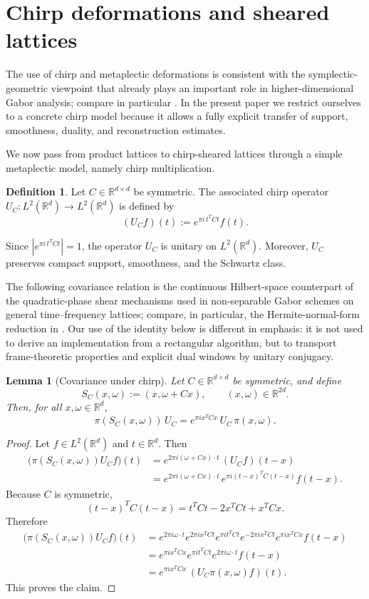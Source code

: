 \documentclass[final,1p,times,authoryear]{elsarticle}
\newtheorem{lemma}[theorem]{Lemma}
\theoremstyle{definition}
\newtheorem{definition}[theorem]{Definition}
\newcommand{\R}{\mathbb{R}}
\newcommand{\1}{\mathbf{1}}
\begin{document}
\section{Chirp deformations and sheared lattices}
\label{sec:chirp}
The use of chirp and metaplectic deformations is consistent with the symplectic-geometric viewpoint that already plays an important role in higher-dimensional Gabor analysis; compare in particular \citep{PRW12}. In the present paper we restrict ourselves to a concrete chirp model because it allows a fully explicit transfer of support, smoothness, duality, and reconstruction estimates.

{We now pass from product lattices to chirp-sheared lattices through a simple metaplectic model,
namely chirp multiplication.}

\begin{definition}
Let $C\in\R^{d\times d}$ be symmetric. The associated chirp operator
$U_C:L^2(\R^d)\to L^2(\R^d)$ is defined by
$$
(U_C f)(t):=e^{\pi i\, t^T C t}f(t).
$$
\end{definition}

Since $|e^{\pi i\, t^T C t}|=1$, the operator $U_C$ is unitary on $L^2(\R^d)$.
Moreover, $U_C$ preserves compact support, smoothness, and the Schwartz class.


The following covariance relation is the continuous Hilbert-space counterpart of the
quadratic-phase shear mechanisms used in non-separable Gabor schemes on general
time--frequency lattices; compare, in particular, the Hermite-normal-form reduction in
\citet{VanLeestBastiaans2000}. Our use of the identity below is different in emphasis:
it is not used to derive an implementation from a rectangular algorithm, but to transport
frame-theoretic properties and explicit dual windows by unitary conjugacy.
\begin{lemma}[Covariance under chirp]\label{lem:chirp_covariance}
Let $C\in \R^{d\times d}$ be symmetric, and define
$$
S_C(x,\omega):=(x,\omega+Cx), \qquad (x,\omega)\in \R^{2d}.
$$
Then, for all $x,\omega\in \R^d$,
$$
\pi(S_C(x,\omega))\,U_C
=
e^{\pi i x^T C x}\,U_C\,\pi(x,\omega).
$$
\end{lemma}

\begin{proof}
Let $f\in L^2(\R^d)$ and $t\in \R^d$. Then
\begin{align*}
\big(\pi(S_C(x,\omega))U_C f\big)(t)
&=
e^{2\pi i (\omega+Cx)\cdot t}\,
(U_C f)(t-x)\\
&=
e^{2\pi i (\omega+Cx)\cdot t}\,
e^{\pi i (t-x)^T C (t-x)}f(t-x).
\end{align*}
Because $C$ is symmetric,
$$
(t-x)^TC(t-x)=t^TCt-2x^TCt+x^TCx.
$$
Therefore
\begin{align*}
\big(\pi(S_C(x,\omega))U_C f\big)(t)
&=
e^{2\pi i\omega\cdot t}
e^{2\pi i x^TCt}
e^{\pi i t^TCt}
e^{-2\pi i x^TCt}
e^{\pi i x^TCx}
f(t-x)\\
&=
e^{\pi i x^TCx}
e^{\pi i t^TCt}
e^{2\pi i\omega\cdot t}
f(t-x)\\
&=
e^{\pi i x^TCx}\,(U_C\pi(x,\omega)f)(t).
\end{align*}
This proves the claim.
\end{proof}
\end{document}
